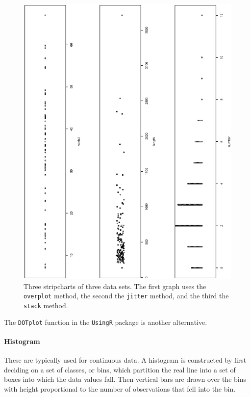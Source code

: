 \documentclass[captions=tableheading]{scrbook}
\begin{document}
  \begin{figure}[th]
    \includegraphics[angle=270, totalheight=4in]{ps/stripcharts.ps}
    \caption[Strip charts of \texttt{precip}, \texttt{rivers}, and \texttt{discoveries}]{\small Three stripcharts of three data sets.  The first graph uses the \texttt{overplot} method, the second the \texttt{jitter} method, and the third the \texttt{stack} method.}
    \label{fig:stripcharts}
  \end{figure}


The \texttt{DOTplot} function in the \texttt{UsingR} package \cite{usingr} is another alternative.

\paragraph*{Histogram}

These are typically used for continuous data. A histogram is constructed by first deciding on a set of classes, or bins, which partition the real line into a set of boxes into which the data values fall. Then vertical bars are drawn over the bins with height proportional to the number of observations that fell into the bin. 
\end{document}
